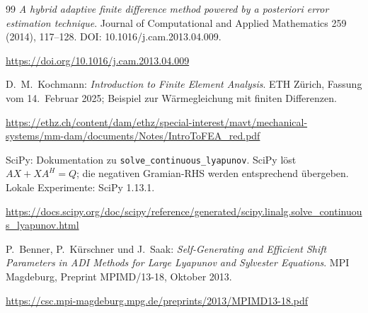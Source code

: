 \begin{thebibliography}{99}
 \emph{A hybrid adaptive finite difference method powered by a posteriori error estimation technique}. Journal of Computational and Applied Mathematics 259 (2014), 117--128. DOI: 10.1016/j.cam.2013.04.009.\par
\url{https://doi.org/10.1016/j.cam.2013.04.009}

 D.~M.~Kochmann: \emph{Introduction to Finite Element Analysis}. ETH Zürich, Fassung vom 14.~Februar 2025; Beispiel zur Wärmegleichung mit finiten Differenzen.\par
\url{https://ethz.ch/content/dam/ethz/special-interest/mavt/mechanical-systems/mm-dam/documents/Notes/IntroToFEA_red.pdf}

 SciPy: Dokumentation zu \texttt{solve\_continuous\_lyapunov}. SciPy löst $AX+XA^H=Q$; die negativen Gramian-RHS werden entsprechend übergeben. Lokale Experimente: SciPy 1.13.1.\par
\url{https://docs.scipy.org/doc/scipy/reference/generated/scipy.linalg.solve_continuous_lyapunov.html}

 P.~Benner, P.~Kürschner und J.~Saak: \emph{Self-Generating and Efficient Shift Parameters in ADI Methods for Large Lyapunov and Sylvester Equations}. MPI Magdeburg, Preprint MPIMD/13-18, Oktober 2013.\par
\url{https://csc.mpi-magdeburg.mpg.de/preprints/2013/MPIMD13-18.pdf}
\end{thebibliography}
